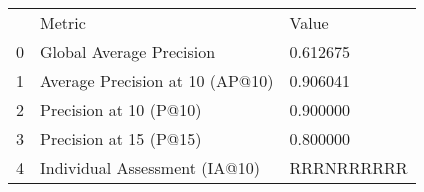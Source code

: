 \begin{tabular}{lll}
 & Metric & Value \\
0 & Global Average Precision & 0.612675 \\
1 & Average Precision at 10 (AP@10) & 0.906041 \\
2 & Precision at 10 (P@10) & 0.900000 \\
3 & Precision at 15 (P@15) & 0.800000 \\
4 & Individual Assessment (IA@10) & RRRNRRRRRR \\
\end{tabular}
